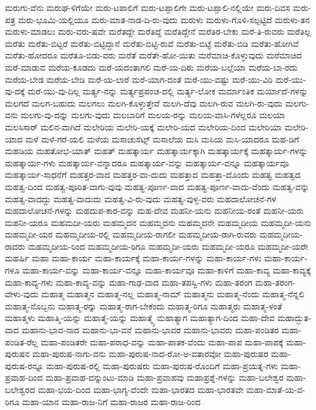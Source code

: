 {ಮರುಗು-ವೆನು
ಮರುಘ-ಳಿಗೆಯೇ
ಮರು-ಟಪಾಲಿಗೆ
ಮರು-ಟಪ್ಪಾಲಿಗೇ
ಮರು-ಟಪ್ಪಾಲಿ-ನಲ್ಲಿಯೇ
ಮರು-ದಿವಸ
ಮರು-ಪತ್ರ
ಮರು-ಭೂಮಿ-ಯಲ್ಲಿಯೂ
ಮರು-ಮಾತ-ನಾಡ-ದಿ-ರು-ವುದು
ಮರುಳು
ಮರುಳು-ಗೊಳಿ-ಸಲ್ಪಟ್ಟಿದೆ
ಮರುಳು-ತನ
ಮರುಳು-ಮಾಡಲು
ಮರು-ವರು-ಷವೇ
ಮರೆತದ್ದೇ
ಮರೆತಿದ್ದೆ
ಮರೆತಿದ್ದೇನೆ
ಮರೆತಿರ-ಬೇಕು
ಮರೆ-ತಿ-ರುವರು
ಮರೆತಿಲ್ಲ
ಮರೆತು
ಮರೆತು-ಬಿಟ್ಟರೆ
ಮರೆತು-ಬಿಟ್ಟಿದ್ದಾನೆ
ಮರೆತು-ಬಿಟ್ಟಿ-ರುವೆ
ಮರೆತು-ಬಿಟ್ಟೆ
ಮರೆತು-ಬಿಡಿ
ಮರೆತು-ಹೋಗಿವೆ
ಮರೆತು-ಹೋದರೂ
ಮರೆತೂ-ಬಿಡು-ವರು
ಮರೆತೆ
ಮರೆತೇ-ಹೋ-ಯಿತು
ಮರೆಮಾಚಿ-ಕೊಳ್ಳುವುದು
ಮರೆಮಾಚಿದ
ಮರೆ-ಮಾಡುವ
ಮರೆಯ-ಕೂಡದು
ಮರೆ-ಯದಂತಾಗಲಿ
ಮರೆ-ಯ-ದಿರು
ಮರೆಯ-ಬಲ್ಲೆಯಾ
ಮರೆಯ-ಬಾ-ರದು
ಮರೆಯ-ಬೇಡ
ಮರೆಯ-ಬೇಡಿ
ಮರೆ-ಯ-ಲಾರೆ
ಮರೆ-ಯಾಗ-ದಂತೆ
ಮರೆ-ಯು-ವಷ್ಟು
ಮರೆ-ಯು-ವಿರಿ
ಮರೆ-ಯು-ವು-ದಕ್ಕೆ
ಮರೆ-ಯು-ವು-ದಿಲ್ಲ
ಮರ್ತ್ಯ-ನನ್ನು
ಮರ್ತ್ಯಪ್ರಪಂಚ-ದಲ್ಲಿ
ಮರ್ತ್ಯ-ಲೋಕ
ಮರ್ಮಾಂತಿಕ
ಮರ್ಯಾದೆ-ಗಳನ್ನು
ಮಲಗದೆ
ಮಲಗ-ಬಹುದು
ಮಲಗಲು
ಮಲಗಿ-ಕೊಳ್ಳುತ್ತೇವೆ
ಮಲಗಿ-ದೆವು
ಮಲಗಿ-ರುವ
ಮಲಗಿ-ರು-ವುದು
ಮಲಗು-ವನು
ಮಲಗು-ವು-ದನ್ನು
ಮಲಗು-ವುದು
ಮಲಬಾರಿಗೆ
ಮಲಯ-ರನ್ನು
ಮಲಯ-ವಾಸಿ-ಗಳೆಲ್ಲರೂ
ಮಲಯಾ
ಮಲಸಿಸಾರ್
ಮಲಿನ-ವಾಗಿದೆ
ಮಲೇರಿಯ
ಮಲೇರಿ-ಯಕ್ಕೆ
ಮಲೇರಿ-ಯದ
ಮಲೇರಿಯ-ದಿಂದ
ಮಲೇರಿಯಾ
ಮಲೇರಿ-ಯಾದ
ಮಳೆ
ಮಳೆ-ಗರೆ-ಯಲಿ
ಮಳೆಯ
ಮಸಾಚುಸೆಟ್ಸ್
ಮಸಾಲೆಯ
ಮಸಿ
ಮಸಿಯ
ಮಸಿ-ಯಾದರೂ
ಮಹ-ಡಿಗೆ
ಮಹಡಿಯ
ಮಹತೋಭ-ಯಾತ್
ಮಹತ್
ಮಹತ್ಕಾರ್ಯ
ಮಹತ್ಕಾರ್ಯಕ್ಕಾಗಿ
ಮಹತ್ಕಾರ್ಯಕ್ಕೆ
ಮಹತ್ಕಾರ್ಯ-ಗಳನ್ನು
ಮಹತ್ಕಾರ್ಯ-ಗಳು
ಮಹತ್ಕಾರ್ಯ-ವನ್ನಾದರೂ
ಮಹತ್ಕಾರ್ಯ-ವನ್ನು
ಮಹತ್ಕಾರ್ಯ-ವನ್ನೂ
ಮಹತ್ಕಾರ್ಯವೂ
ಮಹತ್ಕಾರ್ಯ-ಸಾಧನೆಗೆ
ಮಹತ್ತರ-ವಾದ
ಮಹತ್ತರ-ವಾ-ದುದು
ಮಹತ್ತಾದ
ಮಹತ್ತಾ-ದೊಂದು
ಮಹತ್ವ
ಮಹತ್ವದ
ಮಹತ್ವ-ದಿಂದ
ಮಹತ್ವ-ಪೂರಿತ-ವಾಗು-ವುವು
ಮಹತ್ವ-ಪೂರ್ಣ-ವಾದ
ಮಹತ್ವ-ಪೂರ್ಣ-ವಾದು-ವೆಂದು
ಮಹತ್ವ-ವನ್ನು
ಮಹತ್ವ-ವಾದದ್ದು
ಮಹತ್ವ-ವಾದುದು
ಮಹತ್ವ-ವಿ-ರು-ವುದು
ಮಹತ್ವ-ವುಳ್ಳ-ವರು
ಮಹದಾಲೋಚನೆ-ಗಳ
ಮಹದಾಲೋಚನೆ-ಗಳನ್ನು
ಮಹದುಪ-ಕಾರ-ವನ್ನು
ಮಹ-ದೇವ
ಮಹನೀ-ಯನು
ಮಹನೀಯ-ರಂತೆ
ಮಹನೀ-ಯರು
ಮಹನೀ-ಯರೂ
ಮಹಮದೀ-ಯರು
ಮಹಮ್ಮದನ
ಮಹಮ್ಮದನು
ಮಹಮ್ಮದನೇ
ಮಹಮ್ಮದೀಯ
ಮಹಮ್ಮದೀ-ಯನು
ಮಹಮ್ಮದೀ-ಯರ
ಮಹಮ್ಮದೀಯ-ರಲ್ಲಿ
ಮಹಮ್ಮದೀಯ-ರಾಗಲೀ
ಮಹಮ್ಮದೀಯ-ರಾಗಿ-ರುವರು
ಮಹಮ್ಮದೀಯ-ರಾದರು
ಮಹಮ್ಮದೀಯ-ರಿಂದ
ಮಹಮ್ಮದೀಯ-ರಿಗೂ
ಮಹಮ್ಮದೀ-ಯರು
ಮಹಮ್ಮದೀ-ಯರೂ
ಮಹಮ್ಮದೀ-ಯರೇ
ಮಹರ್ಷಿ
ಮಹಾ
ಮಹಾ-ಕಾರ್ಯ
ಮಹಾ-ಕಾರ್ಯಕ್ಕೆ
ಮಹಾ-ಕಾರ್ಯ-ಗಳನ್ನು
ಮಹಾ-ಕಾರ್ಯ-ಗಳು
ಮಹಾ-ಕಾರ್ಯ-ಗಳೂ
ಮಹಾ-ಕಾರ್ಯ-ವನ್ನು
ಮಹಾ-ಕಾರ್ಯ-ವನ್ನೂ
ಮಹಾ-ಕಾರ್ಯವೂ
ಮಹಾ-ಕಾಳಿಗೆ
ಮಹಾ-ಕಾವ್ಯ
ಮಹಾ-ಕಾವ್ಯಕ್ಕೆ
ಮಹಾ-ಕಾವ್ಯ-ಗಳು
ಮಹಾ-ಕಾವ್ಯ-ವನ್ನು
ಮಹಾ-ಗಾಢ-ವಾದ
ಮಹಾ-ತಪಸ್ವಿ-ಗಳು
ಮಹಾ-ತರಂಗ
ಮಹಾ-ತರಂಗ-ವೇಳು-ವುದು
ಮಹಾತ್ಮ
ಮಹಾತ್ಮನ
ಮಹಾತ್ಮ-ನಲ್ಲ
ಮಹಾತ್ಮ-ನಾಮ್
ಮಹಾತ್ಮನು
ಮಹಾತ್ಮ-ನೆಂದು
ಮಹಾತ್ಮ-ನೆನ್ನಲಿ
ಮಹಾತ್ಮ-ನೊಬ್ಬನು
ಮಹಾತ್ಮ-ರನ್ನು
ಮಹಾತ್ಮ-ರಾಗ-ಬೇಕೆಂದು
ಮಹಾತ್ಮ-ರಿಗೂ
ಮಹಾತ್ಮರು
ಮಹಾತ್ಮ-ಳಂತೆ
ಮಹಾತ್ಮಳು
ಮಹಾತ್ಮಿ-ಯನ್ನು
ಮಹಾತ್ಮೆ-ಯನ್ನು
ಮಹಾತ್ಮ್ಯೆ
ಮಹಾತ್ಯಾಗ
ಮಹಾತ್ಯಾಗ-ದಿಂದ
ಮಹಾ-ದೇವ
ಮಹಾದ್ಭುತ-ವಾದ
ಮಹಾನು-ಭಾವ-ನಾದ
ಮಹಾನು-ಭಾ-ವನೆ
ಮಹಾನು-ಭಾವರ
ಮಹಾನು-ಭಾವರು
ಮಹಾ-ಪಂಡಿತರ
ಮಹಾ-ಪಂಡಿತ-ರೆಲ್ಲ
ಮಹಾ-ಪಂಡಿತರೇ
ಮಹಾ-ಪರಾಧ-ವನ್ನು
ಮಹಾ-ಪಾತಕ-ವೆಂದು
ಮಹಾ-ಪಾಪ
ಮಹಾ-ಪಾಪಕ್ಕೆ
ಮಹಾ-ಪುರುಷನ
ಮಹಾ-ಪುರುಷ-ನಾಗು-ವನು
ಮಹಾ-ಪುರುಷ-ನಾದ-ರೋ-ಅ-ವತಾರವೋ
ಮಹಾ-ಪುರುಷರ
ಮಹಾ-ಪುರುಷ-ರನ್ನೂ
ಮಹಾ-ಪುರುಷ-ರಲ್ಲಿ
ಮಹಾ-ಪುರುಷರು
ಮಹಾ-ಪುರುಷ-ರೊಂದಿಗೆ
ಮಹಾ-ಪ್ರಯತ್ನ-ಗಳು
ಮಹಾ-ಪ್ರವಾಹ-ದಿಂದ
ಮಹಾ-ಪ್ರವಾಹ-ವನ್ನುಂಟು-ಮಾಡಿ
ಮಹಾ-ಪ್ರವಾಹವು
ಮಹಾಪ್ರಶ್ನೆ-ಗಳನ್ನು
ಮಹಾ-ಬಲೇಶ್ವರ
ಮಹಾ-ಬಲೇಶ್ವರದ
ಮಹಾ-ಭಯ-ದಿಂದ
ಮಹಾ-ಭಾಗ್ಯ-ವೆಂದೇ
ಮಹಾ-ಭಾರತದ
ಮಹಾ-ಭಾರತವೇ
ಮಹಾ-ಮಾತೆ-ಯ-ವ-ರಿಗೂ
ಮಹಾ-ಯಾನ
ಮಹಾ-ರಾಜ-ನಿಗೆ
ಮಹಾ-ರಾಜರ
ಮಹಾ-ರಾಜ-ರಿಂದ
}
